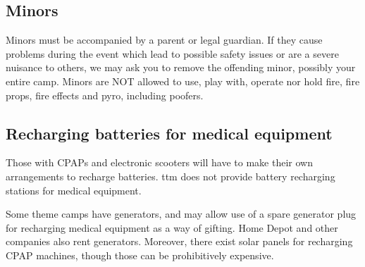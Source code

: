 \begin{multicols}{2}

\subsection*{Minors}
Minors must be accompanied by a parent or legal guardian. If they cause problems during the event which lead to possible safety issues or are a severe nuisance to others, we may ask you to remove the offending minor, possibly your entire camp. Minors are NOT allowed to use, play with, operate nor hold fire, fire props, fire effects and pyro, including poofers.  


\subsection*{Recharging batteries for medical equipment}
Those with CPAPs and electronic scooters will have to make their own arrangements to recharge batteries.  \gls{ttm} does not provide battery recharging stations for medical equipment.

Some theme camps have generators, and may allow use of a spare generator plug for recharging medical equipment as a way of \gls{gifting}.  Home Depot and other companies also rent generators.  Moreover, there exist solar panels for recharging CPAP machines, though those can be prohibitively expensive.



\end{multicols}
